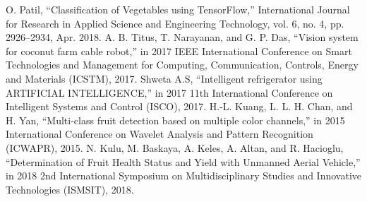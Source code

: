 \documentclass[conference]{IEEEtran}
\begin{document}
\begin{thebibliography}{00}
		 O. Patil, ``Classification of Vegetables using TensorFlow,'' International Journal for Research in Applied Science and Engineering Technology, vol. 6, no. 4, pp. 2926–2934, Apr. 2018.
		 A. B. Titus, T. Narayanan, and G. P. Das, ``Vision system for coconut farm cable robot,'' in 2017 IEEE International Conference on Smart Technologies and Management for Computing, Communication, Controls, Energy and Materials (ICSTM), 2017.
		 Shweta A.S, ``Intelligent refrigerator using ARTIFICIAL INTELLIGENCE,'' in 2017 11th International Conference on Intelligent Systems and Control (ISCO), 2017.
		 H.-L. Kuang, L. L. H. Chan, and H. Yan, ``Multi-class fruit detection based on multiple color channels,'' in 2015 International Conference on Wavelet Analysis and Pattern Recognition (ICWAPR), 2015.
		 N. Kulu, M. Baskaya, A. Keles, A. Altan, and R. Hacioglu, ``Determination of Fruit Health Status and Yield with Unmanned Aerial Vehicle,'' in 2018 2nd International Symposium on Multidisciplinary Studies and Innovative Technologies (ISMSIT), 2018.
	\end{thebibliography}
\end{document}
